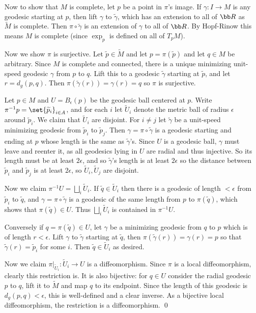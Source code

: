     Now to show that $M$ is complete, let $p$ be a point in $\pi$'s image.
    If $\gamma\colon I\to M$ is any geodesic starting at $p$, then lift $\gamma$ to $\tilde\gamma$, which has an extension to all of $\bR$ as $\tilde M$ is complete.
    Then $\pi\circ\tilde\gamma$ is an extension of $\gamma$ to all of $\bR$.
    By Hopf-Rinow this means $M$ is complete (since $\exp_p$ is defined on all of $T_pM$).

    Now we show $\pi$ is surjective.
    Let $\tilde p\in\tilde M$ and let $p=\pi(\tilde p)$ and let $q\in M$ be arbitrary.
    Since $M$ is complete and connected, there is a unique minimizing unit-speed geodesic $\gamma$ from $p$ to $q$.
    Lift this to a geodesic $\tilde\gamma$ starting at $\tilde p$, and let $r=d_g(p,q)$.
    Then $\pi(\tilde\gamma(r))=\gamma(r)=q$ so $\pi$ is surjective.

    Let $p\in M$ and $U=B_\epsilon(p)$ be the geodesic ball centered at $p$.
    Write $\pi^{-1}p=\set{\tilde p_i}_{i\in A}$, and for each $i$ let $\tilde U_i$ denote the metric ball of radius $\epsilon$ around $\tilde p_i$.
    We claim that $\tilde U_i$ are disjoint.
    For $i\neq j$ let $\tilde\gamma$ be a unit-speed minimizing geodesic from $\tilde p_i$ to $\tilde p_j$.
    Then $\gamma=\pi\circ\tilde\gamma$ is a geodesic starting and ending at $p$ whose length is the same as $\tilde\gamma$'s.
    Since $U$ is a geodesic ball, $\gamma$ must leave and reenter it, as all geodesics lying in $U$ are radial and thus injective.
    So its length must be at least $2\epsilon$, and so $\tilde\gamma$'s length is at least $2\epsilon$ so the distance between $\tilde p_i$ and $\tilde p_j$
    is at least $2\epsilon$, so $\tilde U_i,\tilde U_j$ are disjoint.

    Now we claim $\pi^{-1}U=\bigsqcup_i\tilde U_i$.
    If $\tilde q\in\tilde U_i$ then there is a geodesic of length $<\epsilon$ from $\tilde p_i$ to $\tilde q$, and $\gamma=\pi\circ\tilde\gamma$ is a geodesic of the
    same length from $p$ to $\pi(\tilde q)$, which shows that $\pi(\tilde q)\in U$.
    Thus $\bigsqcup_i\tilde U_i$ is contained in $\pi^{-1}U$.

    Conversely if $q=\pi(\tilde q)\in U$, let $\gamma$ be a minimizing geodesic from $q$ to $p$ which is of length $r<\epsilon$.
    Lift $\gamma$ to $\tilde\gamma$ starting at $\tilde q$, then $\pi(\tilde\gamma(r))=\gamma(r)=p$ so that $\tilde\gamma(r)=\tilde p_i$ for some $i$.
    Then $\tilde q\in\tilde U_i$ as desired.

    Now we claim $\pi|_{\tilde U_i}\colon\tilde U_i\to U$ is a diffeomorphism.
    Since $\pi$ is a local diffeomorphism, clearly this restriction is.
    It is also bijective: for $q\in U$ consider the radial geodesic $p$ to $q$, lift it to $\tilde M$ and map $q$ to its endpoint.
    Since the length of this geodesic is $d_g(p,q)<\epsilon$, this is well-defined and a clear inverse.
    As a bijective local diffeomorphism, the restriction is a diffeomorphism.
    \qed

